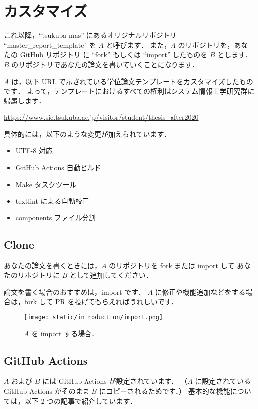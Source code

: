 \section{カスタマイズ}

これ以降，``tsukuba-mas'' にあるオリジナルリポジトリ ``master\_report\_template'' を $A$ と呼びます．
また，$A$ のリポジトリを，あなたの GitHub リポジトリ に ``fork'' もしくは ``import'' したものを $B$ とします．
$B$ のリポジトリであなたの論文を書いていくことになります．

$A$ は，以下 URL で示されている学位論文テンプレートをカスタマイズしたものです．
よって，テンプレートにおけるすべての権利はシステム情報工学研究群に帰属します．

\url{https://www.sie.tsukuba.ac.jp/visitor/student/thesis_after2020}

具体的には，以下のような変更が加えられています．

\begin{itemize}
    \item UTF-8 対応
    \item GitHub Actions 自動ビルド
    \item Make タスクツール
    \item textlint による自動校正
    \item components ファイル分割
\end{itemize}

\subsection{Clone}

あなたの論文を書くときには，$A$ のリポジトリを fork または import して
あなたのリポジトリに $B$ として追加してください．

論文を書く場合のおすすめは，import です．
$A$ に修正や機能追加などをする場合は，fork して PR を投げてもらえればうれしいです．

\begin{figure}[H]
    \centering
    \texttt{[image: static/introduction/import.png]}
    \caption{$A$ を import する場合．}
\end{figure}

\subsection{GitHub Actions}

$A$ および $B$ には GitHub Actions が設定されています．
（$A$ に設定されている GitHub Actions がそのまま $B$ にコピーされるためです．）
基本的な機能については，以下 2 つの記事で紹介しています．

